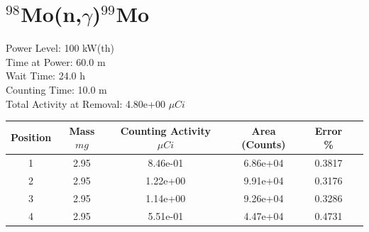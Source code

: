 \newpage

\section*{ $^{98}$Mo(n,$\gamma$)$^{99}$Mo }

Power Level: 100 kW(th) \\
Time at Power: 60.0 m \\
Wait Time: 24.0 h \\
Counting Time: 10.0 m \\
Total Activity at Removal: 4.80e+00 $\mu Ci$

\begin{table}[h]
\centering
\begin{tabular}{ |c|c|c|c|c|c| }
 \hline
 Position & Mass $mg$ & Counting Activity $\mu Ci$ & Area (Counts) & Error \% \\
 \hline 
 1 & 2.95 & 8.46e-01 & 6.86e+04 & 0.3817 \\ 
\hline
 2 & 2.95 & 1.22e+00 & 9.91e+04 & 0.3176 \\ 
\hline
 3 & 2.95 & 1.14e+00 & 9.26e+04 & 0.3286 \\ 
\hline
 4 & 2.95 & 5.51e-01 & 4.47e+04 & 0.4731 \\ 
\hline
\end{tabular}
\end{table}

